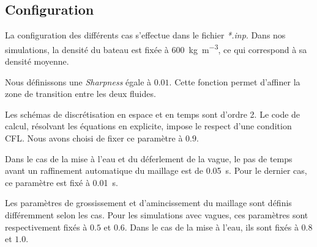 \documentclass[../main.tex]{subfiles}
\begin{document}
\subsection{Configuration}


La configuration des différents cas s'effectue dans le fichier \textit{*.inp}. Dans nos simulations, la densité du bateau est fixée à \qty{600}{\kilogram\per\cubic\meter}, ce qui correspond à sa densité moyenne.

Nous définissons une \textit{Sharpness} égale à $0.01$. Cette fonction permet d'affiner la zone de transition entre les deux fluides.

Les schémas de discrétisation en espace et en temps sont d'ordre 2. Le code de calcul, résolvant les équations en explicite, impose le respect d'une condition CFL. Nous avons choisi de fixer ce paramètre à $0.9$.

Dans le cas de la mise à l'eau et du déferlement de la vague, le pas de temps avant un raffinement automatique du maillage est de \qty{0.05}{\second}. Pour le dernier cas, ce paramètre est fixé à \qty{0.01}{\second}.

Les paramètres de grossissement et d'amincissement du maillage sont définis différemment selon les cas. Pour les simulations avec vagues, ces paramètres sont respectivement fixés à $0.5$ et $0.6$. Dans le cas de la mise à l'eau, ils sont fixés à $0.8$ et $1.0$.
\end{document}
